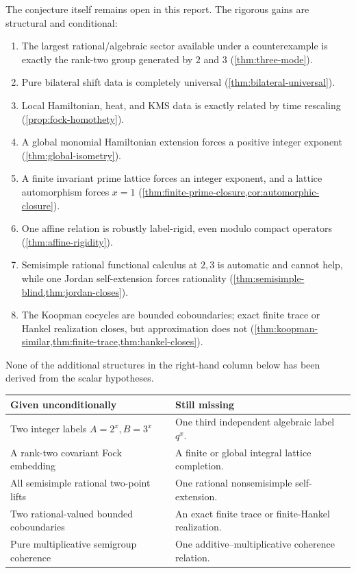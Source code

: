 \documentclass[11pt,oneside]{article}
\theoremstyle{definition}
\theoremstyle{remark}
\begin{document}
The conjecture itself remains open in this report.  The rigorous gains
are structural and conditional:

\begin{enumerate}
\item The largest rational/algebraic sector available under a
      counterexample is exactly the rank-two group generated by \(2\)
      and \(3\) (\cref{thm:three-mode}).
\item Pure bilateral shift data is completely universal
      (\cref{thm:bilateral-universal}).
\item Local Hamiltonian, heat, and KMS data is exactly related by time
      rescaling (\cref{prop:fock-homothety}).
\item A global monomial Hamiltonian extension forces a positive integer
      exponent (\cref{thm:global-isometry}).
\item A finite invariant prime lattice forces an integer exponent, and
      a lattice automorphism forces \(x=1\)
      (\cref{thm:finite-prime-closure,cor:automorphic-closure}).
\item One affine relation is robustly label-rigid, even modulo compact
      operators (\cref{thm:affine-rigidity}).
\item Semisimple rational functional calculus at \(2,3\) is automatic
      and cannot help, while one Jordan self-extension forces
      rationality (\cref{thm:semisimple-blind,thm:jordan-closes}).
\item The Koopman cocycles are bounded coboundaries; exact finite trace
      or Hankel realization closes, but approximation does not
      (\cref{thm:koopman-similar,thm:finite-trace,thm:hankel-closes}).
\end{enumerate}

None of the additional structures in the right-hand column below has
been derived from the scalar hypotheses.

\begin{center}
\begin{tabular}{p{}p{}}
\toprule
\textbf{Given unconditionally} & \textbf{Still missing}\\
\midrule
Two integer labels \(A=2^x,B=3^x\) &
One third independent algebraic label \(q^x\).\\
A rank-two covariant Fock embedding &
A finite or global integral lattice completion.\\
All semisimple rational two-point lifts &
One rational nonsemisimple self-extension.\\
Two rational-valued bounded coboundaries &
An exact finite trace or finite-Hankel realization.\\
Pure multiplicative semigroup coherence &
One additive--multiplicative coherence relation.\\
\bottomrule
\end{tabular}
\end{center}
\end{document}
